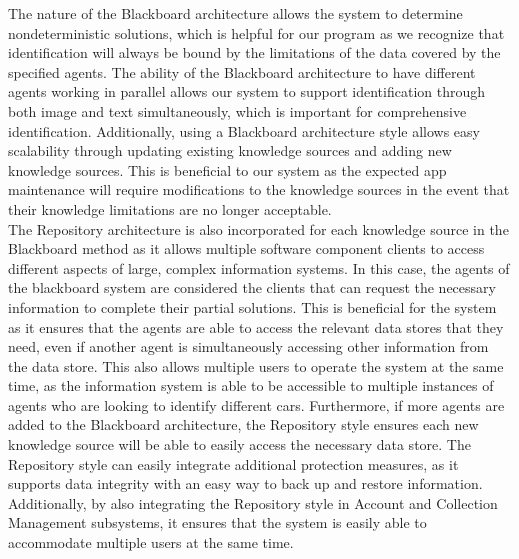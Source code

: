 \documentclass[]{article}
\begin{document}
\noindent The nature of the Blackboard architecture allows the system to determine nondeterministic solutions, which is helpful for our program as we recognize that identification will always be bound by the limitations of the data covered by the specified agents. The ability of the Blackboard architecture to have different agents working in parallel allows our system to support identification through both image and text simultaneously, which is important for comprehensive identification. Additionally, using a Blackboard architecture style allows easy scalability through updating existing knowledge sources and adding new knowledge sources. This is beneficial to our system as the expected app maintenance will require modifications to the knowledge sources in the event that their knowledge limitations are no longer acceptable.\\

\noindent The Repository architecture is also incorporated for each knowledge source in the Blackboard method as it allows multiple software component clients to access different aspects of large, complex information systems. In this case, the agents of the blackboard system are considered the clients that can request the necessary information to complete their partial solutions. This is beneficial for the system as it ensures that the agents are able to access the relevant data stores that they need, even if another agent is simultaneously accessing other information from the data store. This also allows multiple users to operate the system at the same time, as the information system is able to be accessible to multiple instances of agents who are looking to identify different cars. Furthermore, if more agents are added to the Blackboard architecture, the Repository style ensures each new knowledge source will be able to easily access the necessary data store. The Repository style can easily integrate additional protection measures, as it supports data integrity with an easy way to back up and restore information. Additionally, by also integrating the Repository style in Account and Collection Management subsystems, it ensures that the system is easily able to accommodate multiple users at the same time.\\
\end{document}
